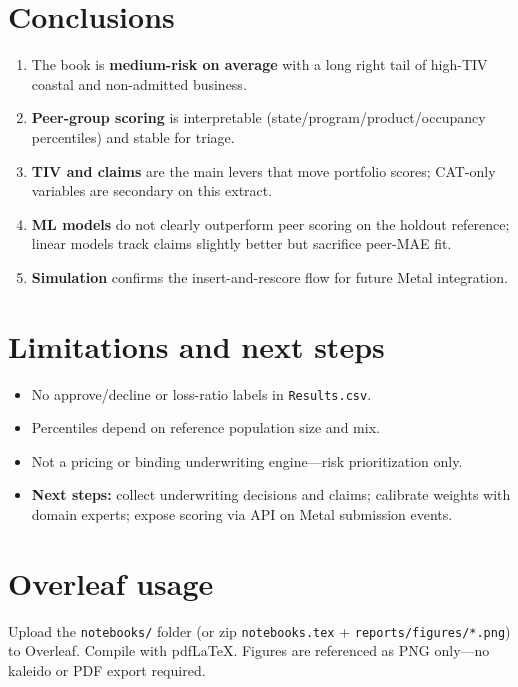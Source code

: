 \documentclass[11pt,a4paper]{article}
\begin{document}
\section{Conclusions}

\begin{enumerate}
  \item The book is \textbf{medium-risk on average} with a long right tail of high-TIV coastal and non-admitted business.
  \item \textbf{Peer-group scoring} is interpretable (state/program/product/occupancy percentiles) and stable for triage.
  \item \textbf{TIV and claims} are the main levers that move portfolio scores; CAT-only variables are secondary on this extract.
  \item \textbf{ML models} do not clearly outperform peer scoring on the holdout reference; linear models track claims slightly better but sacrifice peer-MAE fit.
  \item \textbf{Simulation} confirms the insert-and-rescore flow for future Metal integration.
\end{enumerate}

\section{Limitations and next steps}

\begin{itemize}
  \item No approve/decline or loss-ratio labels in \texttt{Results.csv}.
  \item Percentiles depend on reference population size and mix.
  \item Not a pricing or binding underwriting engine---risk prioritization only.
  \item \textbf{Next steps:} collect underwriting decisions and claims; calibrate weights with domain experts; expose scoring via API on Metal submission events.
\end{itemize}

\section{Overleaf usage}

Upload the \texttt{notebooks/} folder (or zip \texttt{notebooks.tex} + \texttt{reports/figures/*.png})
to Overleaf. Compile with pdfLaTeX. Figures are referenced as PNG only---no kaleido or PDF export required.
\end{document}
